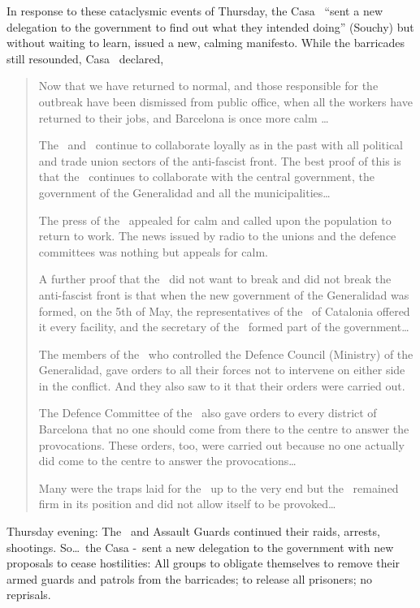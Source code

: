 In response to these cataclysmic events of Thursday, the Casa \CNT\ ``sent a new delegation to the government to find out what they intended doing'' (Souchy) but without waiting to learn, issued a new, calming manifesto. While the barricades still resounded, Casa \CNT\ declared,

\begin{quotation}
  Now that we have returned to normal, and those responsible for the outbreak have been dismissed from public office, when all the workers have returned to their jobs, and Barcelona is once more calm \dots
  
  The \CNT\ and \FAI\ continue to collaborate loyally as in the past with all political and trade union sectors of the anti-fascist front. The best proof of this is that the \CNT\ continues to collaborate with the central government, the government of the Generalidad and all the municipalities\dots
  
  The press of the \CNT\ appealed for calm and called upon the population to return to work. The news issued by radio to the unions and the defence committees was nothing but appeals for calm.
  
  A further proof that the \CNT\ did not want to break and did not break the anti-fascist front is that when the new government of the Generalidad was formed, on the 5th of May, the representatives of the \CNT\ of Catalonia offered it every facility, and the secretary of the \CNT\ formed part of the government\dots
  
  The members of the \CNT\ who controlled the Defence Council (Ministry) of the Generalidad, gave orders to all their forces not to intervene on either side in the conflict. And they also saw to it that their orders were carried out.
  
  The Defence Committee of the \CNT\ also gave orders to every district of Barcelona that no one should come from there to the centre to answer the provocations. These orders, too, were carried out because no one actually did come to the centre to answer the provocations\dots
  
  Many were the traps laid for the \CNT\ up to the very end but the \CNT\ remained firm in its position and did not allow itself to be provoked\dots
\end{quotation}

Thursday evening: The \PSUC\ and Assault Guards continued their raids, arrests, shootings. So\dots\ the Casa \CNT-\FAI\ sent a new delegation to the government with new proposals to cease hostilities: All groups to obligate themselves to remove their armed guards and patrols from the barricades; to release all prisoners; no reprisals.

